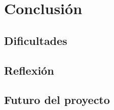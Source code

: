 \section{Conclusión}
\subsection{Dificultades}

\subsection{Reflexión}

\newpage
\subsection{Futuro del proyecto}
